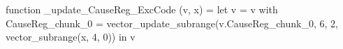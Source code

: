 function _update_CauseReg_ExcCode (v, x) = let v = { v with CauseReg_chunk_0 = vector_update_subrange(v.CauseReg_chunk_0, 6, 2, vector_subrange(x, 4, 0)) } in v
